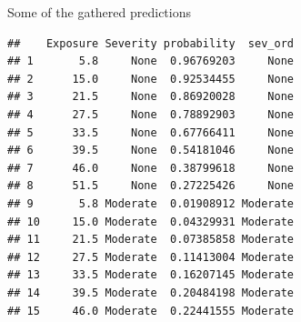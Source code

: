 \documentclass[ignorenonframetext,]{beamer}
\newenvironment{Shaded}{\begin{snugshade}}{\end{snugshade}}
\newcommand{\DecValTok}[1]{\textcolor[rgb]{0.00,0.00,0.81}{#1}}
\newcommand{\KeywordTok}[1]{\textcolor[rgb]{0.13,0.29,0.53}{\textbf{#1}}}
\newcommand{\NormalTok}[1]{#1}
\newcommand{\OperatorTok}[1]{\textcolor[rgb]{0.81,0.36,0.00}{\textbf{#1}}}
\newcommand{\StringTok}[1]{\textcolor[rgb]{0.31,0.60,0.02}{#1}}
\begin{document}
\begin{frame}[fragile]{Some of the gathered predictions}
\protect\hypertarget{some-of-the-gathered-predictions}{}

\begin{Shaded}
\end{Shaded}

\begin{verbatim}
##    Exposure Severity probability  sev_ord
## 1       5.8     None  0.96769203     None
## 2      15.0     None  0.92534455     None
## 3      21.5     None  0.86920028     None
## 4      27.5     None  0.78892903     None
## 5      33.5     None  0.67766411     None
## 6      39.5     None  0.54181046     None
## 7      46.0     None  0.38799618     None
## 8      51.5     None  0.27225426     None
## 9       5.8 Moderate  0.01908912 Moderate
## 10     15.0 Moderate  0.04329931 Moderate
## 11     21.5 Moderate  0.07385858 Moderate
## 12     27.5 Moderate  0.11413004 Moderate
## 13     33.5 Moderate  0.16207145 Moderate
## 14     39.5 Moderate  0.20484198 Moderate
## 15     46.0 Moderate  0.22441555 Moderate
\end{verbatim}

\end{frame}
\end{document}
